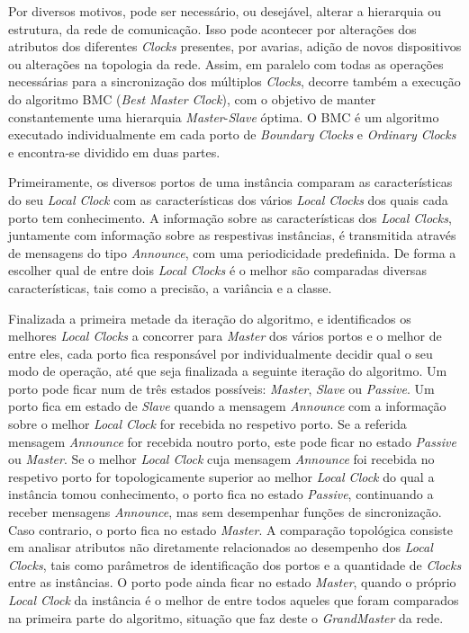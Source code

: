 Por diversos motivos, pode ser necessário, ou desejável, alterar a hierarquia ou estrutura, da rede de comunicação. Isso pode acontecer por alterações dos atributos dos diferentes \textit{Clocks} presentes, por avarias, adição de novos dispositivos ou alterações na topologia da rede. Assim, em paralelo com todas as operações necessárias para a sincronização dos múltiplos \textit{Clocks}, decorre também a execução do algoritmo BMC (\textit{Best Master Clock}), com o objetivo de manter constantemente uma hierarquia \textit{Master}-\textit{Slave} óptima. O BMC é um algoritmo executado individualmente em cada porto de \textit{Boundary Clocks} e \textit{Ordinary Clocks} e encontra-se dividido em duas partes.\par Primeiramente, os diversos portos de uma instância comparam as características do seu \textit{Local Clock} com as características dos vários \textit{Local Clocks} dos quais cada porto tem conhecimento. A informação sobre as características dos \textit{Local Clocks}, juntamente com informação sobre as respestivas instâncias, é transmitida através de mensagens do tipo \textit{Announce}, com uma periodicidade predefinida. De forma a escolher qual de entre dois \textit{Local Clocks} é o melhor são comparadas diversas características, tais como a precisão, a variância e a classe.  \par
Finalizada a primeira metade da iteração do algoritmo, e identificados os melhores \textit{Local Clocks} a concorrer para \textit{Master} dos vários portos e o melhor de entre eles, cada porto fica responsável por individualmente decidir qual o seu modo de operação, até que seja finalizada a seguinte iteração do algoritmo. Um porto pode ficar num de três estados possíveis: \textit{Master}, \textit{Slave} ou \textit{Passive}. Um porto fica em estado de \textit{Slave} quando a mensagem \textit{Announce} com a informação sobre o melhor \textit{Local Clock} for recebida no respetivo porto.
Se a referida mensagem \textit{Announce} for recebida noutro porto, este pode ficar no estado \textit{Passive} ou \textit{Master}. Se o melhor \textit{Local Clock} cuja mensagem \textit{Announce} foi recebida no respetivo porto for topologicamente superior ao melhor \textit{Local Clock} do qual a instância tomou conhecimento, o porto fica no estado \textit{Passive}, continuando a receber mensagens \textit{Announce}, mas sem desempenhar funções de sincronização. Caso contrario, o porto fica no estado \textit{Master}. A comparação topológica consiste em analisar atributos não diretamente relacionados ao desempenho dos \textit{Local Clocks}, tais como parâmetros de identificação dos portos e a quantidade de \textit{Clocks} entre as instâncias. O porto pode ainda ficar no estado \textit{Master}, quando o próprio \textit{Local Clock} da instância é o melhor de entre todos aqueles que foram comparados na primeira parte do algoritmo, situação que faz deste o \textit{GrandMaster} da rede.

